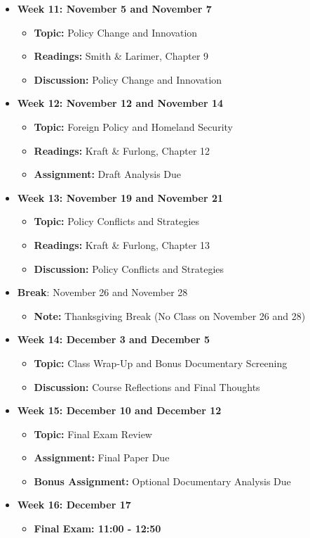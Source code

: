 \documentclass[12pt, letterpaper]{article}
\begin{document}
\begin{itemize}
    \item \textbf{Week 11: November 5 and November 7}
    \begin{itemize}
        \item \textbf{Topic:} Policy Change and Innovation
        \item \textbf{Readings:} Smith \& Larimer, Chapter 9
        \item \textbf{Discussion:} Policy Change and Innovation
    \end{itemize}

    \item \textbf{Week 12: November 12 and November 14}
    \begin{itemize}
        \item \textbf{Topic:} Foreign Policy and Homeland Security
        \item \textbf{Readings:} Kraft \& Furlong, Chapter 12
        \item \textbf{Assignment:} Draft Analysis Due
    \end{itemize}

    \item \textbf{Week 13: November 19 and November 21}
    \begin{itemize}
        \item \textbf{Topic:} Policy Conflicts and Strategies
        \item \textbf{Readings:} Kraft \& Furlong, Chapter 13
        \item \textbf{Discussion:} Policy Conflicts and Strategies
    \end{itemize}

    \item \textbf{Break}: November 26 and November 28
    \begin{itemize}
        \item \textbf{Note:} Thanksgiving Break (No Class on November 26 and 28)
    \end{itemize}

    \item \textbf{Week 14: December 3 and December 5}
    \begin{itemize}
        \item \textbf{Topic:} Class Wrap-Up and Bonus Documentary Screening 
        \item \textbf{Discussion:} Course Reflections and Final Thoughts
    \end{itemize}

    \item \textbf{Week 15: December 10 and December 12}
    \begin{itemize}
        \item \textbf{Topic:} Final Exam Review
        \item \textbf{Assignment:} Final Paper Due
        \item \textbf{Bonus Assignment:} Optional Documentary Analysis Due
    \end{itemize}

    \item \textbf{Week 16: December 17}
    \begin{itemize}
        \item \textbf{Final Exam: 11:00 - 12:50}
    \end{itemize}
\end{itemize}
\end{document}
